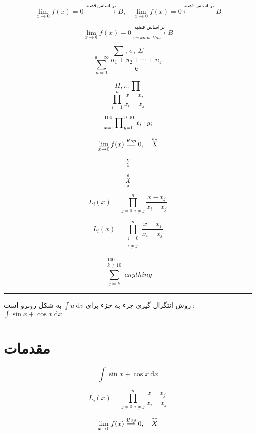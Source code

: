 \documentclass[12pt]{article}
\begin{document}
\[
\lim_{x \to 0} f(x) = 0 \xrightarrow{\text{بر اساس قضیه}} B,\quad \lim_{x \to 0} f(x) = 0 \xleftarrow{\text{بر اساس قضیه}} B
\]

\[
\lim_{x \to 0} f(x) = 0 \xrightarrow[we\ know\ that\ \cdots]{\text{بر اساس قضیه}} B
\]

\[
\sum,\ \sigma,\ \Sigma
\]
\[
\sum_{n = 1}^{n = \infty}  \frac{n_1 + n_2 + \cdots + n_k}{k}
\]

\[
\Pi,\pi,\prod
\]
\[
\prod_{i=1}^{n} \frac{x-x_i}{x_i+x_j}
\]

\[
\sideset{_{x=1}^{100}}{_{y=1}^{1000}}{\prod} x_{i} \cdot y_{i}
\]

\[
\lim_{x \to 0} f(x) \overset{Hop}{= \joinrel =} 0,\quad \overset{\ast\ast}{X}
\]

\[
\underset{*}{Y}
\]

\[
\overset{a}{\underset{b}{X}}
\]

\[
L_i(x) = \prod_{j=0,i \neq j}^{n} \frac{x-x_j}{x_i - x_j}
\]

\[
L_i(x) = \prod_{\substack{j=0\\i \neq j}}^{n} \frac{x-x_j}{x_i - x_j}
\]

\[
\sum_{j=k}^{\substack{100\\ k \neq 10}}anything
\]

\rule{\textwidth}{1pt}

روش انتگرال گیری جزء به جزء برای 
$
\int u\ \mathrm{d}v
$
به شکل روبرو است : 
$
\int \sin x + \cos x \ \mathrm{d}x
$


\section{مقدمات}

\begin{equation} \label{eq1}
\int \sin x + \cos x \ \mathrm{d}x
\end{equation}

\begin{equation} \label{eq2}
L_i(x) = \prod_{j=0,i \neq j}^{n} \frac{x-x_j}{x_i - x_j}
\end{equation}


\begin{equation} \label{eq3}
\lim_{x \to 0} f(x) \overset{Hop}{= \joinrel =} 0,\quad \overset{\ast\ast}{X}
\end{equation}
\end{document}
